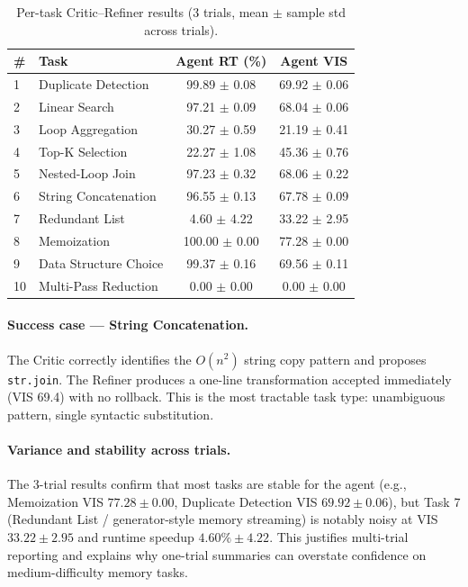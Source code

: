\documentclass{article}
\begin{document}
\begin{table}[h]
\centering
\caption{Per-task Critic--Refiner results (3 trials, mean $\pm$ sample std across trials).}
\label{tab:pertask}
\small
\begin{tabular}{llcc}
\toprule
\textbf{\#} & \textbf{Task} & \textbf{Agent RT (\%)} & \textbf{Agent VIS} \\
\midrule
1  & Duplicate Detection   & 99.89 $\pm$ 0.08 & 69.92 $\pm$ 0.06 \\
2  & Linear Search         & 97.21 $\pm$ 0.09 & 68.04 $\pm$ 0.06 \\
3  & Loop Aggregation      & 30.27 $\pm$ 0.59 & 21.19 $\pm$ 0.41 \\
4  & Top-K Selection       & 22.27 $\pm$ 1.08 & 45.36 $\pm$ 0.76 \\
5  & Nested-Loop Join      & 97.23 $\pm$ 0.32 & 68.06 $\pm$ 0.22 \\
6  & String Concatenation  & 96.55 $\pm$ 0.13 & 67.78 $\pm$ 0.09 \\
7  & Redundant List        & 4.60 $\pm$ 4.22  & 33.22 $\pm$ 2.95 \\
8  & Memoization           & 100.00 $\pm$ 0.00 & 77.28 $\pm$ 0.00 \\
9  & Data Structure Choice & 99.37 $\pm$ 0.16 & 69.56 $\pm$ 0.11 \\
10 & Multi-Pass Reduction  & 0.00 $\pm$ 0.00  & 0.00 $\pm$ 0.00 \\
\bottomrule
\end{tabular}
\end{table}

\paragraph{Success case --- String Concatenation.}
The Critic correctly identifies the $O(n^2)$ string copy pattern and proposes \texttt{str.join}. The Refiner produces a one-line transformation accepted immediately (VIS 69.4) with no rollback. This is the most tractable task type: unambiguous pattern, single syntactic substitution.

\paragraph{Variance and stability across trials.}
The 3-trial results confirm that most tasks are stable for the agent (e.g., Memoization VIS $77.28\pm0.00$, Duplicate Detection VIS $69.92\pm0.06$), but Task 7 (Redundant List / generator-style memory streaming) is notably noisy at VIS $33.22\pm2.95$ and runtime speedup $4.60\%\pm4.22$. This justifies multi-trial reporting and explains why one-trial summaries can overstate confidence on medium-difficulty memory tasks.
\end{document}
